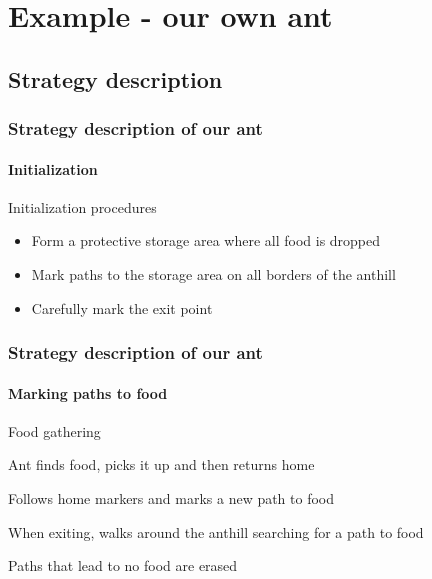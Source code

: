 \documentclass{beamer}
\begin{document}
\section{Example - our own ant}
\subsection{Strategy description}

\begin{frame}
  \frametitle{Strategy description of our ant}
  \framesubtitle{Initialization}
\begin{center}
  \end{center}
    \begin{block}{Initialization procedures}
    \begin{itemize}
        \pause \item Form a protective storage area where all food is
        dropped
        \pause \item Mark paths to the storage area on all borders
        of the anthill
        \pause \item Carefully mark the exit point
    \end{itemize}
    \end{block}
\end{frame}

\begin{frame}
  \frametitle{Strategy description of our ant}
  \framesubtitle{Marking paths to food}
\begin{center}
  \end{center}
    \begin{block}{\small Food gathering}
    \begin{itemize}
    {\small
        \pause \item Ant finds food, picks it up and then returns home
        \pause \item Follows home markers and marks a new path to food
        \pause \item When exiting, walks around the anthill searching for a path to food
        \pause \item Paths that lead to no food are erased
    }
    \end{itemize}
    \end{block}
\end{frame}
\end{document}
